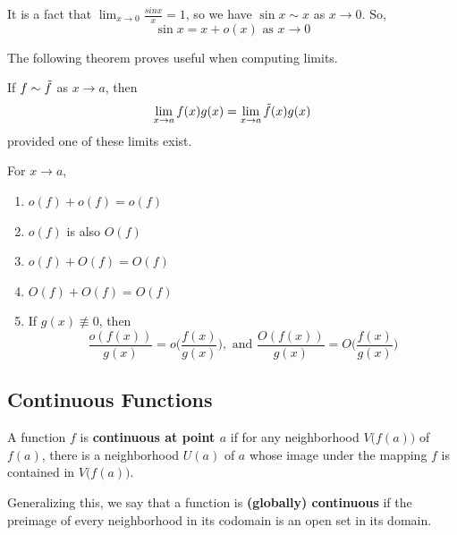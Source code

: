     \begin{example}
      It is a fact that $\lim_{x\rightarrow 0} \frac{sin{x}}{x} = 1$, so we have $\sin{x} \sim x$ as $x \rightarrow 0$. So,
      \begin{equation}
        \sin{x} = x + o(x) \text{ as } x \rightarrow 0
      \end{equation}
    \end{example}

    The following theorem proves useful when computing limits. 

    \begin{theorem}
      If $f \sim \Tilde{f}$ as $x \rightarrow a$, then 
      \begin{equation}
        \lim_{x \rightarrow a} f(x) g(x) = \lim_{x \rightarrow a} \Tilde{f}(x) g(x)
      \end{equation}
      provided one of these limits exist. 
    \end{theorem}

    \begin{theorem}
      For $x \rightarrow a$, 
      \begin{enumerate}
        \item $o(f) + o(f) = o(f)$
        \item $o(f)$ is also $O(f)$
        \item $o(f) + O(f) = O(f)$
        \item $O(f) + O(f) = O(f)$
        \item If $g(x) \not\equiv 0$, then 
        \begin{equation}
          \frac{o(f(x))}{g(x)} = o \bigg( \frac{f(x)}{g(x)} \bigg), \text{ and } \frac{O(f(x))}{g(x)} = O \bigg( \frac{f(x)}{g(x)} \bigg)
        \end{equation}
      \end{enumerate}
    \end{theorem}

\subsection{Continuous Functions}

  \begin{definition}
    A function $f$ is \textbf{continuous at point $a$} if for any neighborhood $V\big(f(a)\big)$ of $f(a)$, there is a neighborhood $U(a)$ of $a$ whose image under the mapping $f$ is contained in $V\big( f(a)\big)$. 

    Generalizing this, we say that a function is \textbf{(globally) continuous} if the preimage of every neighborhood in its codomain is an open set in its domain. 
  \end{definition}


